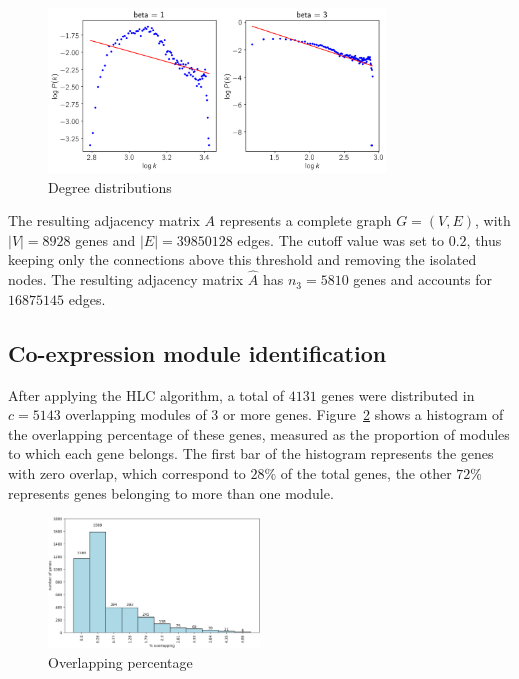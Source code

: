 \documentclass[12pt,journal, onecolumn]{IEEEtran}
\begin{document}
\begin{figure}[h]
  \centering
    \includegraphics[clip,width=0.8\textwidth]{Figures/pick_beta.png}
  \caption{Degree distributions}
  \label{fig:beta}
\end{figure}

The resulting adjacency matrix $A$ represents a complete graph $G=(V,E)$, with $|V| = 8928$ genes and $|E| = 39850128$ edges. The cutoff value was set to $0.2$, thus keeping only the connections above this threshold and removing the isolated nodes. The resulting adjacency matrix $\hat{A}$ has $n_3 = 5810$ genes and accounts for $16875145$ edges.\\


\subsection{Co-expression module identification}
After applying the HLC algorithm, a total of $4131$ genes were distributed in $c = 5143$ overlapping modules of $3$ or more genes. Figure~\ref{fig:overlap} shows a histogram of the overlapping percentage of these genes, measured as the proportion of modules to which each gene belongs. The first bar of the histogram represents the genes with zero overlap, which correspond to $28\%$ of the total genes, the other $72\%$ represents genes belonging to more than one module.

\begin{figure}[h]
  \centering
    \includegraphics[clip,width=0.5\textwidth]{Figures/artificial_modules.png}
  \caption{Overlapping percentage}
  \label{fig:overlap}
\end{figure}
\end{document}
